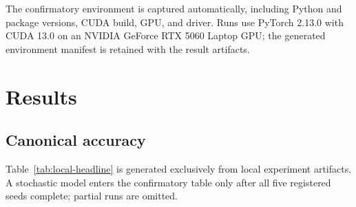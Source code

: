 \documentclass[pdflatex,sn-mathphys-num]{sn-jnl}
\begin{document}
The confirmatory environment is captured automatically, including Python and
package versions, CUDA build, GPU, and driver. Runs use PyTorch 2.13.0 with CUDA
13.0 on an NVIDIA GeForce RTX 5060 Laptop GPU; the generated environment
manifest is retained with the result artifacts.

\section{Results}
\subsection{Canonical accuracy}
Table~\ref{tab:local-headline} is generated exclusively from local experiment
artifacts. A stochastic model enters the confirmatory table only after all five
registered seeds complete; partial runs are omitted.
\end{document}
